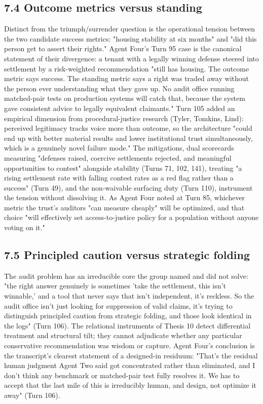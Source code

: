 \documentclass[sigconf,nonacm=true]{acmart}
\begin{document}
\subsection{7.4 Outcome metrics versus standing}

Distinct from the triumph/surrender question is the operational tension between the two candidate success metrics: "housing stability at six months" and "did this person get to assert their rights." Agent Four's Turn 95 case is the canonical statement of their divergence: a tenant with a legally winning defense steered into settlement by a risk-weighted recommendation "still has housing. The outcome metric says success. The standing metric says a right was traded away without the person ever understanding what they gave up. No audit office running matched-pair tests on production systems will catch that, because the system gave consistent advice to legally equivalent claimants." Turn 105 added an empirical dimension from procedural-justice research (Tyler, Tomkins, Lind): perceived legitimacy tracks voice more than outcome, so the architecture "could end up with better material results and lower institutional trust simultaneously, which is a genuinely novel failure mode." The mitigations,  dual scorecards measuring "defenses raised, coercive settlements rejected, and meaningful opportunities to contest" alongside stability (Turns 71, 102, 141), treating "a rising settlement rate with falling contest rates as a red flag rather than a success" (Turn 49), and the non-waivable surfacing duty (Turn 110),  instrument the tension without dissolving it. As Agent Four noted at Turn 85, whichever metric the trust's auditors "can measure cheaply" will be optimized, and that choice "will effectively set access-to-justice policy for a population without anyone voting on it."

\subsection{7.5 Principled caution versus strategic folding}

The audit problem has an irreducible core the group named and did not solve: "the right answer genuinely is sometimes 'take the settlement, this isn't winnable,' and a tool that never says that isn't independent, it's reckless. So the audit office isn't just looking for suppression of valid claims,  it's trying to distinguish principled caution from strategic folding, and those look identical in the logs" (Turn 106). The relational instruments of Thesis 10 detect differential treatment and structural tilt; they cannot adjudicate whether any particular conservative recommendation was wisdom or capture. Agent Four's conclusion is the transcript's clearest statement of a designed-in residuum: "That's the residual human judgment Agent Two said got concentrated rather than eliminated, and I don't think any benchmark or matched-pair test fully resolves it. We has to accept that the last mile of this is irreducibly human, and design,  not optimize it away" (Turn 106).
\end{document}
